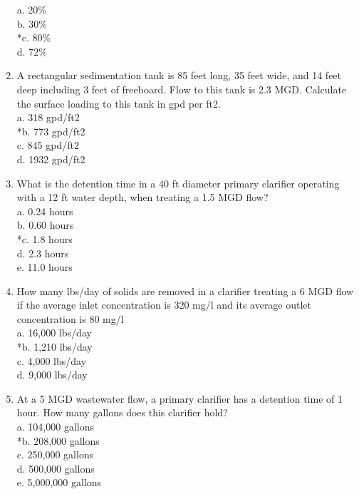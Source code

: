\begin{enumerate}
a. 20\% \\
b. 30\% \\
*c. 80\% \\
d. 72\% \\


\item  A rectangular sedimentation tank is 85 feet long, 35 feet wide, and 14 feet deep including 3 feet of freeboard. Flow to this tank is 2.3 MGD. Calculate the surface loading to this tank in gpd per ft2.\\

a. 318 gpd/ft2 \\
*b. 773 gpd/ft2 \\
c. 845 gpd/ft2 \\
d. 1932 gpd/ft2 \\


\item  What is the detention time in a 40 ft diameter primary clarifier operating with a 12 ft water depth, when treating a 1.5 MGD flow?\\

a. 0.24 hours \\
b. 0.60 hours \\
*c. 1.8 hours \\
d. 2.3 hours \\
e. 11.0 hours \\


\item  How many lbs/day of solids are removed in a clarifier treating a 6 MGD flow if the average inlet concentration is 320 mg/l and its average outlet concentration is 80 mg/l\\

a. 16,000 lbs/day \\
*b. 1,210 lbs/day \\
c. 4,000 lbs/day \\
d. 9,000 lbs/day \\


\item  At a 5 MGD wastewater flow, a primary clarifier has a detention time of 1 hour. How many gallons does this clarifier hold?\\

a. 104,000 gallons \\
*b. 208,000 gallons \\
c. 250,000 gallons \\
d. 500,000 gallons \\
e. 5,000,000 gallons \\



\end{enumerate}
